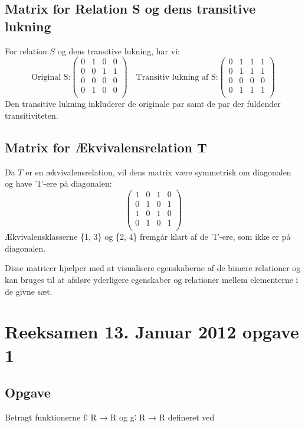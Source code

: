 \documentclass[12pt]{article}
\begin{document}
\subsection{Matrix for Relation S og dens transitive lukning}
For relation \( S \) og dens transitive lukning, har vi:
\[
\text{Original S:}
\begin{pmatrix}
0 & 1 & 0 & 0 \\
0 & 0 & 1 & 1 \\
0 & 0 & 0 & 0 \\
0 & 1 & 0 & 0 \\
\end{pmatrix}
\quad
\text{Transitiv lukning af S:}
\begin{pmatrix}
0 & 1 & 1 & 1 \\
0 & 1 & 1 & 1 \\
0 & 0 & 0 & 0 \\
0 & 1 & 1 & 1 \\
\end{pmatrix}
\]
Den transitive lukning inkluderer de originale par samt de par der fuldender transitiviteten.

\subsection{Matrix for Ækvivalensrelation T}
Da \( T \) er en ækvivalensrelation, vil dens matrix være symmetrisk om diagonalen og have '1'-ere på diagonalen:
\[
\begin{pmatrix}
1 & 0 & 1 & 0 \\
0 & 1 & 0 & 1 \\
1 & 0 & 1 & 0 \\
0 & 1 & 0 & 1 \\
\end{pmatrix}
\]
Ækvivalensklasserne \{1, 3\} og \{2, 4\} fremgår klart af de '1'-ere, som ikke er på diagonalen.

Disse matricer hjælper med at visualisere egenskaberne af de binære relationer og kan bruges til at afsløre yderligere egenskaber og relationer mellem elementerne i de givne sæt.

\section{Reeksamen 13. Januar 2012 opgave 1}
\subsection{Opgave}
Betragt funktionerne f∶ R → R og g∶ R → R defineret ved
\end{document}
